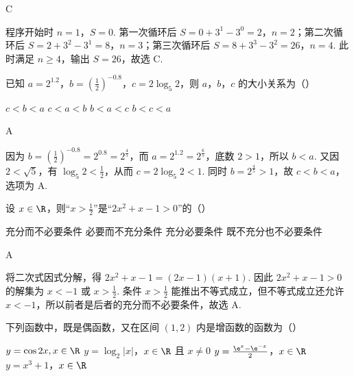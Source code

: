 \begin{answer}
C
\end{answer}

\begin{solution}
程序开始时 \(n=1\)，\(S=0\). 第一次循环后 \(S=0+3^1-3^0=2\)，\(n=2\)；第二次循环后 \(S=2+3^2-3^1=8\)，\(n=3\)；第三次循环后 \(S=8+3^3-3^2=26\)，\(n=4\). 此时满足 \(n\geqslant4\)，输出 \(S=26\)，故选 C.
\end{solution}

\begin{problem}
已知 \(a = 2^{1.2}\)，\(b = \left(\frac{1}{2}\right)^{-0.8}\)，\(c = 2\log_5 2\)，则 \(a\)，\(b\)，\(c\) 的大小关系为（\quad）

\choices
    {\(c < b < a\)}
    {\(c < a < b\)}
    {\(b < a < c\)}
    {\(b < c < a\)}
\end{problem}

\begin{answer}
A
\end{answer}

\begin{solution}
因为 \(b=\left(\frac12\right)^{-0.8}=2^{0.8}=2^{\frac45}\)，而 \(a=2^{1.2}=2^{\frac65}\)，底数 \(2>1\)，所以 \(b<a\). 又因 \(2<\sqrt5\)，有 \(\log_5 2<\frac12\)，从而 \(c=2\log_5 2<1\). 同时 \(b=2^{\frac45}>1\)，故 \(c<b<a\)，选项为 A.
\end{solution}

\begin{problem}
设 \(x \in \R\)，则“\(x > \frac{1}{2}\)”是“\(2x^2 + x - 1 > 0\)”的（\quad）

\choices
    {充分而不必要条件}
    {必要而不充分条件}
    {充分必要条件}
    {既不充分也不必要条件}
\end{problem}

\begin{answer}
A
\end{answer}

\begin{solution}
将二次式因式分解，得 \(2x^2+x-1=(2x-1)(x+1)\). 因此 \(2x^2+x-1>0\) 的解集为 \(x<-1\) 或 \(x>\frac12\). 条件 \(x>\frac12\) 能推出不等式成立，但不等式成立还允许 \(x<-1\)，所以前者是后者的充分而不必要条件，故选 A.
\end{solution}

\begin{problem}
下列函数中，既是偶函数，又在区间 \((1,2)\) 内是增函数的函数为（\quad）

\choices
    {\(y = \cos 2x, x \in \R\)}
    {\(y = \log_2 |x|\)，\(x \in \R\) 且 \( x \neq 0 \)}
    {\(y = \frac{\e^x - \e^{-x}}{2}\)，\(x \in \R\)}
    {\(y = x^{3} + 1\)，\(x \in \R\)}
\end{problem}

